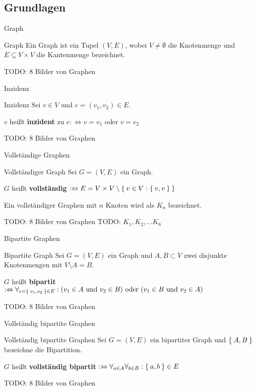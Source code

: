 \subsection{Grundlagen}
\begin{frame}{Graph}
\begin{block}{Graph}
Ein Graph ist ein Tupel $(V, E)$, wobei $V \neq \emptyset$ die Knotenmenge und 
$E \subseteq V \times V$ die 
Kantenmenge bezeichnet.
\end{block}

TODO: 8 Bilder von Graphen
\end{frame}

\begin{frame}{Inzidenz}
\begin{block}{Inzidenz}
Sei $v \in V$ und $e = (v_1, v_2) \in E$.

$v$ heißt \textbf{inzident} zu $e :\Leftrightarrow v = v_1$ oder $v = v_2$
\end{block}

TODO: 8 Bilder von Graphen
\end{frame}

\begin{frame}{Vollständige Graphen}
\begin{block}{Vollständiger Graph}
Sei $G = (V, E)$ ein Graph.

$G$ heißt \textbf{vollständig} $:\Leftrightarrow E = V \times V \setminus \Set{v \in V: \Set{v, v}}$
\end{block}

Ein vollständiger Graphen mit $n$ Knoten wird als $K_n$ bezeichnet.

TODO: 8 Bilder von Graphen
TODO: $K_1, K_2, ... K_8$
\end{frame}

\begin{frame}{Bipartite Graphen}
\begin{block}{Bipartite Graph}
Sei $G = (V, E)$ ein Graph und $A, B \subset V$ zwei disjunkte Knotenmengen mit
$V \setminus A = B$.

$G$ heißt \textbf{bipartit} $:\Leftrightarrow \forall_{e = \Set{v_1, v_2} \in E}: (v_1 \in A \text{ und } v_2 \in B) \text{ oder } (v_1 \in B \text{ und } v_2 \in A) $
\end{block}

TODO: 8 Bilder von Graphen
\end{frame}

\begin{frame}{Vollständig bipartite Graphen}
\begin{block}{Vollständig bipartite Graphen}
Sei $G = (V, E)$ ein bipartiter Graph und $\Set{A, B}$ bezeichne die Bipartition.

$G$ heißt \textbf{vollständig bipartit} $:\Leftrightarrow \forall_{a \in A} \forall_{b \in B}: \Set{a, b} \in E$
\end{block}

TODO: 8 Bilder von Graphen
\end{frame}

